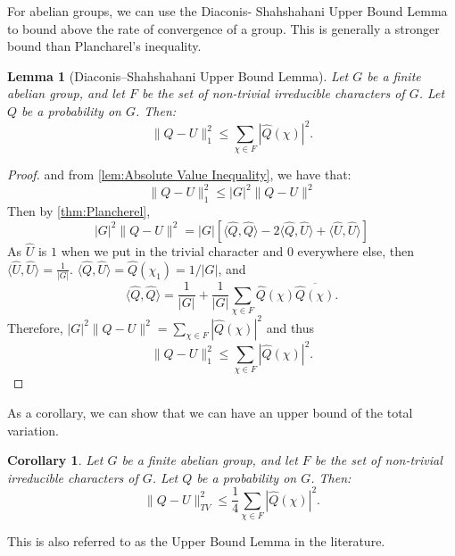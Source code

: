 \documentclass[]{article}
\newtheorem{corollary}[theorem]{Corollary}
\newtheorem{lemma}[theorem]{Lemma}
\theoremstyle{definition}
\numberwithin{theorem}{section}
\numberwithin{equation}{section}
\begin{document}
For abelian groups, we can use the Diaconis- Shahshahani Upper Bound Lemma to bound above the rate of convergence of a group. This is generally a stronger bound than Plancharel's inequality. 
\begin{lemma}[Diaconis–Shahshahani Upper Bound Lemma]
	\label{lem:Upper bound lemma}
	Let $G$ be a finite abelian group, and let $F$ be the set of non-trivial irreducible characters of $G$. Let $Q$ be a probability on $G$.  Then:
	\begin{equation}
		\|Q - U\|^2_{1} \leq \sum_{\chi \in F} |\widehat{Q}(\chi)|^2.
	\end{equation}
\end{lemma}
\begin{proof}[Proof]

	and from \cref{lem:Absolute Value Inequality}, we have that:
	\begin{equation}
		 \| Q - U\|_1^2 \leq |G|^2 \| Q - U \|^2
	\end{equation}
	Then by \cref{thm:Plancherel},
	\begin{equation}
		|G|^2 \|Q - U \|^2 = |G| \left[ \langle \widehat{Q}, \widehat{Q} \rangle - 2 \langle \widehat{Q}, \widehat{U} \rangle + \langle \widehat{U}, \widehat{U} \rangle \right]
	\end{equation}
	As $\widehat{U}$ is $1$ when we put in the trivial character and $0$ everywhere else, then $\langle \widehat{U}, \widehat{U} \rangle = \frac{1}{|G|}$. $\langle \widehat{Q}, \widehat{U} \rangle = \widehat{Q}(\chi_1) = 1/|G|$, and
	\begin{equation}
		\langle \widehat{Q}, \widehat{Q} \rangle =\frac{1}{|G|} + \frac{1}{|G|} \sum_{\chi \in F} \widehat{Q}(\chi) \overline{\widehat{Q}(\chi)}.
	\end{equation}
	Therefore, $|G|^2 \|Q - U \|^2 =  \sum_{\chi \in F}| \widehat{Q}(\chi)|^2$ and thus 
	\begin{equation}
		\|Q - U\|^2_{1} \leq \sum_{\chi \in F} |\widehat{Q}(\chi)|^2.
	\end{equation}
\end{proof}

As a corollary, we can show that we can have an upper bound of the total variation. 
\begin{corollary}
	Let $G$ be a finite abelian group, and let $F$ be the set of non-trivial irreducible characters of $G$. Let $Q$ be a probability on $G$.  Then:
\begin{equation}
	\|Q - U\|^2_{TV} \leq \frac{1}{4}\sum_{\chi \in F} |\widehat{Q}(\chi)|^2.
\end{equation}
\end{corollary}
This is also referred to as the Upper Bound Lemma in the literature.
\end{document}
